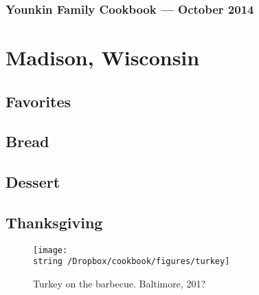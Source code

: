 \documentclass[12pt, final]{book}
\begin{document}
\frontmatter

\cleardoublepage
\section*{Younkin Family Cookbook --- October 2014}

\tableofcontents
\mainmatter
\part{Madison, Wisconsin}
\chapter{Favorites}\label{favorites}

\newpage

\newpage

\newpage
\chapter{Bread}\label{bread}

\newpage

\newpage

\newpage
\chapter{Dessert}\label{dessert}

\newpage

\newpage

\newpage

\clearpage
\chapter{Thanksgiving}\label{chapter2}
\begin{figure}[h]
\begin{center}
\texttt{[image: \\string~/Dropbox/cookbook/figures/turkey]}
\end{center}
\caption*{Turkey on the barbecue. Baltimore, 201?}
\end{figure}
\newpage


\newpage

\newpage

\newpage

\newpage

\newpage

\newpage

\newpage
\end{document}
